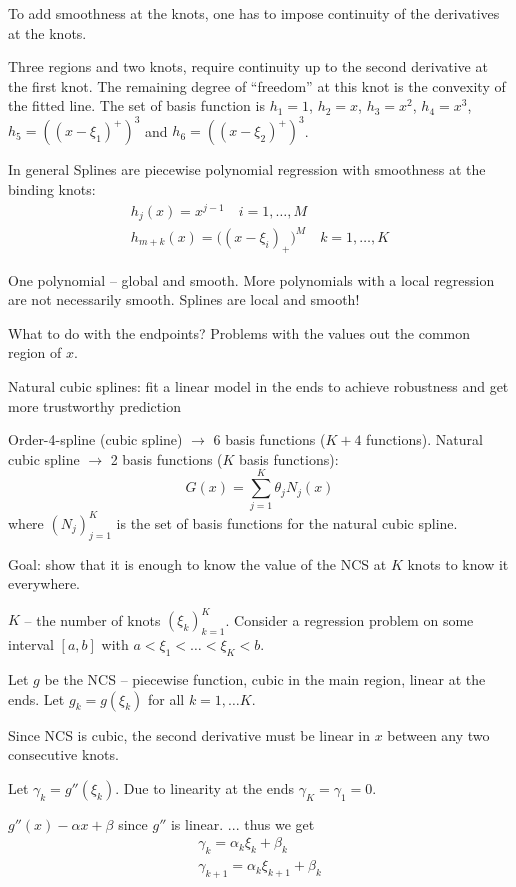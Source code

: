 \documentclass[a4paper]{article}
\newcommand{\clo}[1]{{\left [ #1 \right ]}}
\newcommand{\brac}[1]{{\left ( #1 \right )}}
\begin{document}
To add smoothness at the knots, one has to impose continuity of the derivatives at the knots.

Three regions and two knots, require continuity up to the second derivative at the first knot.
The remaining degree of ``freedom'' at this knot is the convexity of the fitted line.
The set of basis function is $h_1 = 1$, $h_2 = x$, $h_3 = x^2$, $h_4 = x^3$, $h_5 = \brac{\brac{x-\xi_1}^+}^3$ and $h_6 = \brac{\brac{x-\xi_2}^+}^3$.


In general Splines are piecewise polynomial regression with smoothness at the binding knots:
\begin{align*}
	h_j(x) = x^{j-1}\quad i=1,\ldots, M\\
	h_{m+k}(x) = \big((x-\xi_i)_+\big)^M \quad k=1,\ldots,K
\end{align*}

One polynomial -- global and smooth.
More polynomials with a local regression are not necessarily smooth.
Splines are local and smooth!

What to do with the endpoints?
Problems with the values out the common region of $x$.

Natural cubic splines: fit a linear model in the ends to achieve robustness and get more trustworthy prediction

Order-4-spline (cubic spline) $\to$ 6 basis functions ($K+4$ functions).
Natural cubic spline $\to$ 2 basis functions ($K$ basis functions):
\[G(x) = \sum_{j=1}^K \theta_j N_j(x)\]
where $\brac{N_j}_{j=1}^K$ is the set of basis functions for the natural cubic spline.

Goal: show that it is enough to know the value of the NCS at $K$ knots to know it everywhere.

$K$ -- the number of knots $\brac{\xi_k}_{k=1}^K$. Consider a regression problem on some interval $\clo{a,b}$ with $a<\xi_1<\ldots<\xi_K<b$.

Let $g$ be the NCS -- piecewise function, cubic in the main region, linear at the ends.
Let $g_k = g(\xi_k)$ for all $k=1,\ldots K$.

Since NCS is cubic, the second derivative must be linear in $x$ between any two consecutive knots.

Let $\gamma_k=g''(\xi_k)$. Due to linearity at the ends $\gamma_K = \gamma_1 = 0$.

$g''(x) - \alpha x + \beta$ since $g''$ is linear.
...
thus we get
\[
\begin{matrix}
	\gamma_k = \alpha_k \xi_k + \beta_k \\
	\gamma_{k+1} = \alpha_k \xi_{k+1} + \beta_k
\end{matrix}
\]
\end{document}
